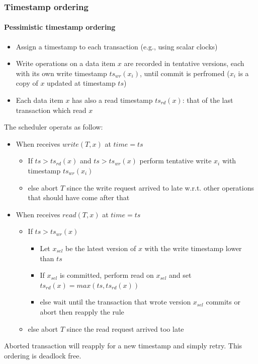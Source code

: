 \documentclass[10pt,a4paper]{article}
\begin{document}
\subsubsection{Timestamp ordering}
\paragraph{Pessimistic timestamp ordering}
\begin{itemize}
	\item Assign a timestamp to each transaction (e.g., using scalar clocks)
	\item Write operations on a data item $x$ are recorded in tentative versions, each with its own write timestamp $ts_{wr}(x_i)$, until commit is perfromed ($x_i$ is a copy of $x$ updated at timestamp $ts$)
	\item Each data item $x$ has also a read timestamp $ts_{rd}(x)$: that of the last transaction which read $x$
\end{itemize}
The scheduler operats as follow:
\begin{itemize}
	\item When receives $write(T,x)$ at $time=ts$
	\begin{itemize}
		\item If $ts>ts_{rd}(x)$ and $ts>ts_{wr}(x)$ perform tentative write $x_i$ with timestamp $ts_{wr}(x_i)$
		\item else abort $T$ since the write request arrived to late w.r.t. other operations that should have come after that
	\end{itemize} \pagebreak
	\item When receives $read(T,x)$ at $time=ts$
	\begin{itemize}
		\item If $ts>ts_{wr}(x)$
		\begin{itemize}
			\item Let $x_{sel}$ be the latest version of $x$ with the write timestamp lower than $ts$
			\item If $x_{sel}$ is committed, perform read on $x_{sel}$ and set $ts_{rd}(x)=max(ts, ts_{rd}(x))$
			\item else wait until the transaction that wrote version $x_{sel}$ commits or abort then reapply the rule
		\end{itemize}
		\item else abort $T$ since the read request arrived too late
	\end{itemize}
\end{itemize}
Aborted transaction will reapply for a new timestamp and simply retry. This ordering is deadlock free.
\end{document}
